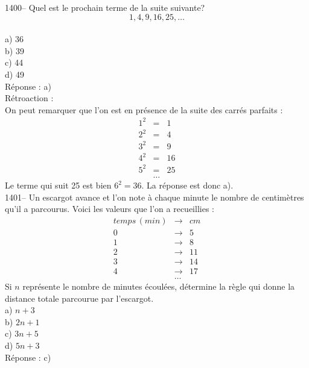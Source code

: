 \topmargin -2cm
\textheight 23.5cm
\textwidth 6.5in
\oddsidemargin -1cm
\setlength{\parindent}{0pt}





1400-- Quel est le prochain terme de la suite suivante?\\
$$1,4,9,16,25,\ldots$$\\
a) 36\\
b) 39\\
c) 44\\
d) 49\\

R\'eponse : a)\\

R\'etroaction :\\
On peut remarquer que l'on est en pr\'esence de la suite des
carr\'es parfaits :
\begin{eqnarray*}
1^2&=&1 \\ 2^2&=&4 \\ 3^2&=&9 \\ 4^2&=&16 \\ 5^2&=&25 \\ &\ldots&
\end{eqnarray*}
Le terme qui suit 25 est bien $6^2=36$. La r\'eponse est donc a).\\

1401-- Un escargot avance et l'on note \`a chaque minute le nombre de
centim\`etres qu'il a parcourus. Voici les valeurs que l'on a
recueillies :
\begin{eqnarray*}
temps \,(min)&\longrightarrow&cm \\
0&\longrightarrow&5 \\ 1&\longrightarrow&8 \\ 2&\longrightarrow&11
\\ 3 &\longrightarrow& 14 \\ 4&\longrightarrow&17 \\ &\ldots&
\end{eqnarray*}
Si $n$ repr\'esente le nombre de minutes \'ecoul\'ees, d\'etermine la
r\`egle qui donne la distance totale parcourue par l'escargot.\\
a) $n+3$\\
b) $2n+1$\\
c) $3n+5$\\
d) $5n+3$\\

R\'eponse : c)\\

